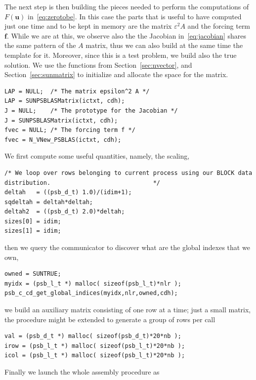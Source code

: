 \documentclass[twoside,a4paper]{refart}
\theoremstyle{definition}
\begin{document}
The next step is then building the pieces needed to perform the computations of $F(\mathbf{u})$ in~\eqref{eq:zerotobe}. In this case the parts that is useful to have computed just one time and to be kept in memory are the matrix $\varepsilon^2 A$ and the forcing term $\mathbf{f}$. While we are at this, we observe also the the Jacobian in~\eqref{eq:jacobian} shares the same pattern of the $A$ matrix, thus we can also build at the same time the template for it. Moreover, since this is a test problem, we build also the true solution. We use the functions from Section~\ref{sec:nvector}, and Section~\ref{sec:sunmatrix} to initialize and allocate the space for the matrix.
\begin{lstlisting}[style=CStyle]
LAP = NULL;  /* The matrix epsilon^2 A */
LAP = SUNPSBLASMatrix(ictxt, cdh); 
J = NULL;    /* The prototype for the Jacobian */
J = SUNPSBLASMatrix(ictxt, cdh);
fvec = NULL; /* The forcing term f */
fvec = N_VNew_PSBLAS(ictxt, cdh);
\end{lstlisting}
We first compute some useful quantities, namely, the scaling,
\begin{lstlisting}[style=CStyle]
/* We loop over rows belonging to current process using our BLOCK data distribution.                             */
deltah   = ((psb_d_t) 1.0)/(idim+1);
sqdeltah = deltah*deltah;
deltah2  = ((psb_d_t) 2.0)*deltah;
sizes[0] = idim;
sizes[1] = idim;
\end{lstlisting}
then we query the communicator to discover what are the global indexes that we own,
\begin{lstlisting}[style=CStyle]
owned = SUNTRUE;
myidx = (psb_l_t *) malloc( sizeof(psb_l_t)*nlr );
psb_c_cd_get_global_indices(myidx,nlr,owned,cdh);
\end{lstlisting}
we build an auxiliary matrix consisting of one row at a time; just a
small matrix, the procedure might be extended to generate a group of rows per call
\begin{lstlisting}[style=CStyle]
val = (psb_d_t *) malloc( sizeof(psb_d_t)*20*nb );
irow = (psb_l_t *) malloc( sizeof(psb_l_t)*20*nb );
icol = (psb_l_t *) malloc( sizeof(psb_l_t)*20*nb );
\end{lstlisting}
Finally we launch the whole assembly procedure as
\end{document}
